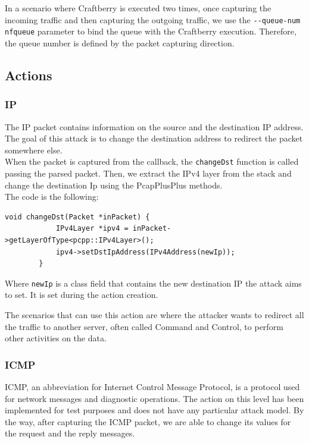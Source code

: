 \documentclass[12pt]{article}
\begin{document}
	In a scenario where Craftberry is executed two times, once capturing the incoming traffic and then capturing the outgoing traffic, we use the \lstinline{--queue-num nfqueue} parameter to bind the queue with the Craftberry execution. Therefore, the queue number is defined by the packet capturing direction.

	\subsection{Actions}

	\subsubsection{IP}
	The IP packet contains information on the source and the destination IP address. The goal of this attack is to change the destination address to redirect the packet somewhere else.\\
	When the packet is captured from the callback, the \lstinline{changeDst} function is called passing the parsed packet. Then, we extract the IPv4 layer from the stack and change the destination Ip using the PcapPlusPlus methods.\\
	The code is the following:
	\bigbreak

	\begin{lstlisting}[frame=single]
		void changeDst(Packet *inPacket) {
			IPv4Layer *ipv4 = inPacket->getLayerOfType<pcpp::IPv4Layer>();
			ipv4->setDstIpAddress(IPv4Address(newIp));
		}
	\end{lstlisting}
	\bigbreak

	Where \lstinline{newIp} is a class field that contains the new destination IP the attack aims to set. It is set during the action creation.

	\bigbreak
	The scenarios that can use this action are where the attacker wants to redirect all the traffic to another server, often called Command and Control, to perform other activities on the data.   
	
	\subsubsection{ICMP}
	ICMP, an abbreviation for Internet Control Message Protocol, is a protocol used for network messages and diagnostic operations. The action on this level has been implemented for test purposes and does not have any particular attack model. By the way, after capturing the ICMP packet, we are able to change its values for the request and the reply messages.
\end{document}
